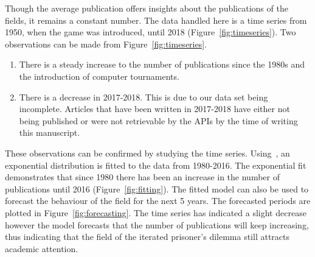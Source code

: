 \documentclass{article}
\theoremstyle{definition}
\begin{document}
Though the average publication offers insights about the publications of the
fields, it remains a constant number. The data handled here is a time
series from 1950, when the game was introduced, until 2018 (Figure~\ref{fig:timeseries}). 
Two observations can be made from Figure~\ref{fig:timeseries}.

\begin{enumerate}
    \item There is a steady increase to the number of publications since the
    1980s and the introduction of computer tournaments.
    \item There is a decrease in 2017-2018. This is due to our data set being
    incomplete. Articles that have been written in 2017-2018 have either not
    being published or were not retrievable by the APIs by the time of writing
    this manuscript.
\end{enumerate}

These observations can be confirmed by studying the time series.
Using~\cite{scipy}, an exponential distribution is fitted to the data from
1980-2016. The exponential fit demonstrates that since 1980 there has been an
increase in the number of publications until 2016 (Figure~\ref{fig:fitting}).
The fitted model can also be used to forecast the behaviour of the field for the
next 5 years. The forecasted periods are plotted in
Figure~\ref{fig:forecasting}. The time series has indicated a slight decrease
however the model forecasts that the number of publications will keep
increasing, thus indicating that the field of the iterated prisoner's dilemma
still attracts academic attention.
\end{document}
